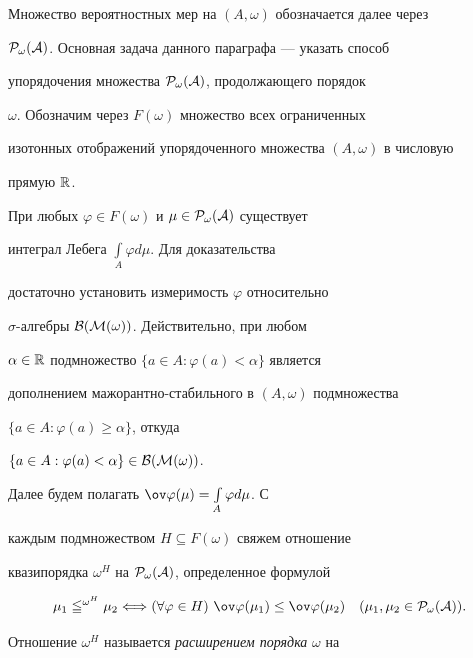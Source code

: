Множество вероятностных мер на $(A,\omega)$ обозначается далее через 


$\cal P_\omega(A)$. Основная задача данного параграфа --- указать способ 


упорядочения множества $\cal P_\omega(A)$, продолжающего порядок 


$\omega$. Обозначим через $F(\omega)$ множество всех ограниченных 


изотонных отображений упорядоченного множества $(A,\omega)$ в числовую 


прямую $\Bbb R$. 


 


\begin{notenonum} 


При любых $\varphi\in F(\omega)$ и $\mu\in\cal P_\omega(A)$ существует 


интеграл Лебега $\int\limits_A\varphi d\mu$. Для доказательства 


достаточно установить измеримость $\varphi$ относительно 


$\sigma$-алгебры $\cal B(M(\omega))$. Действительно, при любом 


$\alpha\in \Bbb R$ подмножество $\{a\in A:\varphi(a)<\alpha\}$ является 


дополнением мажорантно-стабильного в $(A,\omega)$ подмножества 


$\{a\in A:\varphi(a)\ge \alpha\}$, откуда 


$\{a\in A:\varphi(a)<\alpha\}\in\cal B(M(\omega))$. 


\end{notenonum} 


 


Далее будем полагать $\ov\varphi(\mu)=\int\limits_A\varphi d\mu$. С 


каждым подмножеством $H\subseteq F(\omega)$ свяжем отношение 


квазипорядка $\omega^H$ на $\cal P_\omega(A)$, определенное формулой 


$$ 


\mu_1\leqq^{\omega^H}\mu_2\Longleftrightarrow 


(\forall\varphi\in H)\ \ov\varphi(\mu_1)\le\ov\varphi(\mu_2) 


\quad (\mu_1,\mu_2\in\cal P_\omega(A)). 


$$ 


Отношение $\omega^H$ называется {\em расширением порядка} $\omega$ на 


